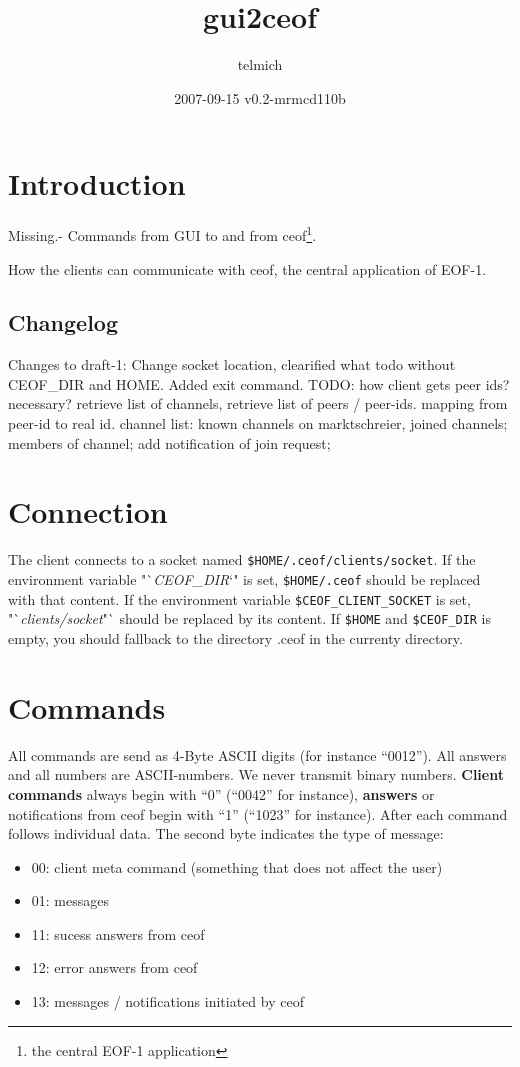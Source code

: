 \documentclass[12pt,a4paper]{article}
\begin{document}
\title{gui2ceof}
\date{2007-09-15 v0.2-mrmcd110b}
\author{telmich}

\maketitle

\section{Introduction}
Missing.- Commands from GUI to and from
ceof\footnote{the central EOF-1 application}.

How the clients can communicate with ceof, the central application of EOF-1.

\subsection{Changelog}
Changes to draft-1: Change socket location, clearified what todo without CEOF_DIR and HOME. Added exit command. TODO: how client gets peer ids? necessary? retrieve list of channels, retrieve list of peers / peer-ids. mapping from peer-id to real id. channel list: known channels on marktschreier, joined channels; members of channel; add notification of join request;

\section{Connection}
The client connects to a socket named \verb=$HOME/.ceof/clients/socket=.
If the environment variable "`\textit{CEOF_DIR}`" is set,
\verb=$HOME/.ceof= should be replaced with that content.
If the environment variable \verb=$CEOF_CLIENT_SOCKET= is set,
"`\textit{clients/socket}"` should be replaced by its content.
If \verb=$HOME= and \verb=$CEOF_DIR= is empty, you should fallback
 to the directory .ceof in the currenty directory.

\section{Commands}
All commands are send as 4-Byte ASCII digits (for instance "`0012"').
All answers and all numbers are ASCII-numbers. We never transmit binary numbers.
\textbf{Client commands} always begin with "`0"' ("`0042"' for instance),
\textbf{answers} or notifications from ceof begin with "`1"' ("`1023"' for instance).
 After each command follows individual data. The second byte indicates the type of message:
\begin{itemize}
\item 00: client meta command (something that does not affect the user)
\item 01: messages
\item 11: sucess answers from ceof
\item 12: error answers from ceof
\item 13: messages / notifications initiated by ceof
\end{itemize}
\end{document}
